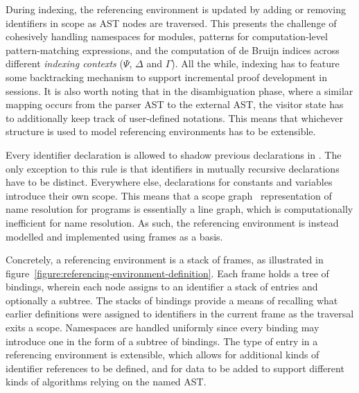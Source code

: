 During indexing, the referencing environment is updated by adding or removing identifiers in scope as \ac{AST} nodes are traversed.
This presents the challenge of cohesively handling namespaces for modules, patterns for computation-level pattern-matching expressions, and the computation of de Bruijn indices across different \textit{indexing contexts} ($\Psi$, $\Delta$ and $\Gamma$).
All the while, indexing has to feature some backtracking mechanism to support incremental proof development in \Harpoon sessions.
It is also worth noting that in the disambiguation phase, where a similar mapping occurs from the parser \ac{AST} to the external \ac{AST}, the visitor state has to additionally keep track of user-defined notations.
This means that whichever structure is used to model referencing environments has to be extensible.


Every identifier declaration is allowed to shadow previous declarations in \Beluga.
The only exception to this rule is that identifiers in mutually recursive declarations have to be distinct.
Everywhere else, declarations for constants and variables introduce their own scope.
This means that a scope graph~\cite{nameresolution} representation of name resolution for \Beluga programs is essentially a line graph, which is computationally inefficient for name resolution.
As such, the referencing environment is instead modelled and implemented using frames as a basis.

Concretely, a referencing environment is a stack of frames, as illustrated in figure~\ref{figure:referencing-environment-definition}.
Each frame holds a tree of bindings, wherein each node assigns to an identifier a stack of entries and optionally a subtree.
The stacks of bindings provide a means of recalling what earlier definitions were assigned to identifiers in the current frame as the traversal exits a scope.
Namespaces are handled uniformly since every binding may introduce one in the form of a subtree of bindings.
The type of entry in a referencing environment is extensible, which allows for additional kinds of identifier references to be defined, and for data to be added to support different kinds of algorithms relying on the named \ac{AST}.

